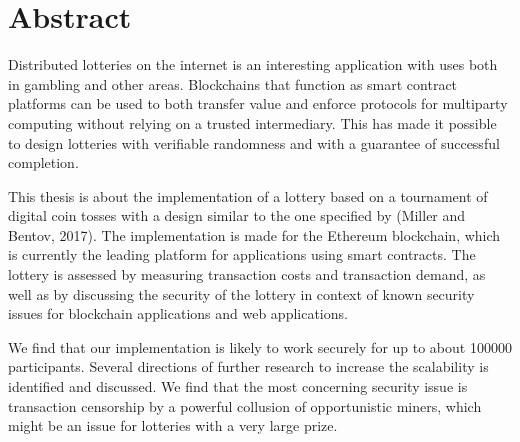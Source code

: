 \chapter*{Abstract}

Distributed lotteries on the internet is an interesting application with uses both in gambling and other areas. Blockchains that function as smart contract platforms can be used to both transfer value and enforce protocols for multiparty computing without relying on a trusted intermediary. This has made it possible to design lotteries with verifiable randomness and with a guarantee of successful completion. 

This thesis is about the implementation of a lottery based on a tournament of digital coin tosses with a design similar to the one specified by (Miller and Bentov, 2017). The implementation is made for the Ethereum blockchain, which is currently the leading platform for applications using smart contracts. The lottery is assessed by measuring transaction costs and transaction demand, as well as by discussing the security of the lottery in context of known security issues for blockchain applications and web applications.

We find that our implementation is likely to work securely for up to about 100000 participants. Several directions of further research to increase the scalability is identified and discussed. We find that the most concerning security issue is transaction censorship by a powerful collusion of opportunistic miners, which might be an issue for lotteries with a very large prize.

\hypersetup{pageanchor=false}